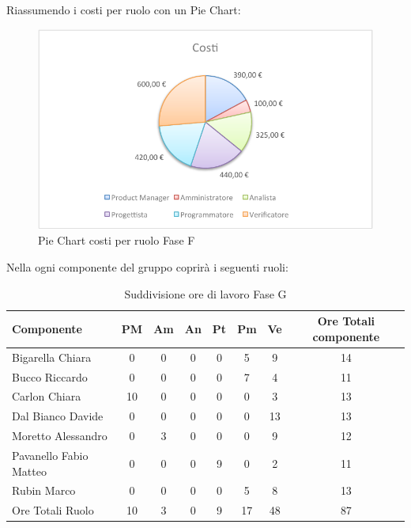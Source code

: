 				Riassumendo i costi per ruolo con un Pie Chart:
				\begin{figure}[H]\centering
					\includegraphics[width=\textwidth]{PianoDiProgetto/Pics/ChartTotCostiFaseF.pdf}
					\caption{Pie Chart costi per ruolo Fase F}
				\end{figure}
				Nella  ogni componente del gruppo \groupname{} coprirà i seguenti ruoli:
				\begin{table}[H]
					\begin{center}
						\begin{tabular}{| l | c | c | c | c | c | c | c |}
							\hline
							Componente 				& PM	& Am 	& An 	& Pt 		& Pm 	& Ve 	& Ore Totali componente \\ \hline
							
							Bigarella Chiara 			& 0		& 0		& 0		& 0		& 5 		& 9 		& 14 \\
							Bucco Riccardo 			& 0		& 0		& 0		& 0		& 7		& 4 		& 11 \\
							Carlon Chiara	 			& 10 		& 0		& 0		& 0		& 0		& 3 		& 13 \\
							Dal Bianco Davide 			& 0		& 0		& 0		& 0		& 0		& 13 		& 13 \\
							Moretto Alessandro 			& 0		& 3 		& 0		& 0		& 0		& 9 		& 12 \\
							Pavanello Fabio Matteo	 	& 0		& 0		& 0		& 9 		& 0		& 2 		& 11 \\
							Rubin Marco				& 0		& 0		& 0		& 0		& 5 		& 8 		& 13 \\ \hline \hline
							
							Ore Totali Ruolo 			& 10 		& 3 		& 0		& 9 		& 17 		& 48 		& 87\\ \hline
						\end{tabular}
					\end{center}
					\caption{Suddivisione ore di lavoro Fase G}
				\end{table}
